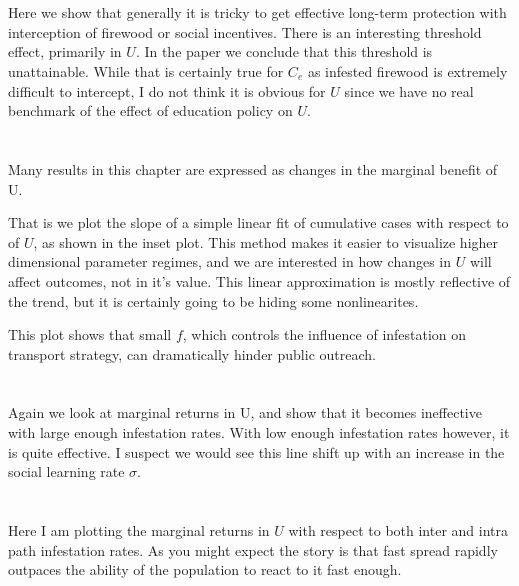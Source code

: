 \documentclass{article}
\begin{document}
\section{}

Here we show that generally it is tricky to get effective long-term protection with interception of firewood or social incentives. There is an interesting threshold effect, primarily in $U$. In the paper we conclude that this threshold is unattainable. While that is certainly true for $C_e$ as infested firewood is extremely difficult to intercept, I do not think it is obvious for $U$ since we have no real benchmark of the effect of education policy on $U$.



\section{}

Many results in this chapter are expressed as changes in the marginal benefit of U. 

That is we plot the slope of a simple linear fit of cumulative cases with respect to of $U$, as shown in the inset plot. This method makes it easier to visualize higher dimensional parameter regimes, and we are interested in how changes in $U$ will affect outcomes, not in it's value. This linear approximation is mostly reflective of the trend, but it is certainly going to be hiding some nonlinearites.

This plot shows that small $f$, which controls the influence of infestation on transport strategy, can dramatically hinder public outreach.

\section{}

Again we look at marginal returns in U, and show that it becomes ineffective with large enough infestation rates. With low enough infestation rates however, it is quite effective. I suspect we would see this line shift up with an increase in the social learning rate $\sigma$.

\section{}

Here I am plotting the marginal returns in $U$ with respect to both inter and intra path infestation rates. As you might expect the story is that fast spread rapidly outpaces the ability of the population to react to it fast enough. 
\end{document}
